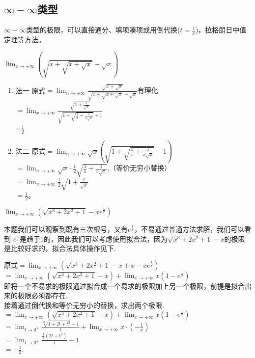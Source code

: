 \subsection{$\infty - \infty$类型}
$\infty - \infty$类型的极限，可以直接通分、填项凑项或用倒代换($t=\frac{1}{x}$)，拉格朗日中值定理等方法。
\begin{example}
	$\lim_{x \to +\infty}(\sqrt{x+\sqrt{x+\sqrt{x}}}-\sqrt{x})$
\end{example}
\begin{solution}
	\begin{enumerate}
		\item 法一
		      原式$=\lim_{n \to +\infty}\frac{\sqrt{x+\sqrt{x}}}{\sqrt{x+\sqrt{x+\sqrt{x}}}+\sqrt{x}}\text{有理化}$\\
		      $=\lim_{x \to +\infty}\frac{\sqrt{1+\frac{1}{\sqrt{x}}}}{\sqrt{1+\sqrt{\frac{1}{x}+\frac{1}{x\sqrt{x}}}}+1}$\\
		      =$\frac{1}{2}$
		\item 法二
		      原式$=\lim_{n \to +\infty}\sqrt{x}(\sqrt {1+\sqrt{\frac{1}{x}+\frac{1}{x\sqrt{x}}}}-1)$\\
		      $=\lim_{n \to +\infty}\sqrt{x}\cdot \frac{1}{2}\sqrt{\frac{1}{x}+\frac{1}{x\sqrt{x}}}.$（等价无穷小替换）\\
		      $=\lim_{n \to +\infty}\frac{1}{2}\sqrt{1+\frac{1}{\sqrt{x}}}$\\
		      $=\frac{1}{2}$。
	\end{enumerate}
\end{solution}
\begin{example}
	$\lim_{x \to +\infty}(\sqrt{x^3+2x^2+1}-xe^{\frac{1}{x}})$
	\begin{solution}
		本题我们可以观察到既有三次根号，又有$e^{\frac{1}{x}}$，不易通过普通方法求解，我们可以看到
		$e^{\frac{1}{x}}$是趋于1的，因此我们可以考虑使用拟合法，因为$\sqrt{x^3+2x^2+1}-x$的极限是比较好求的，拟合法具体操作见下.

		原式$=\lim_{x \to +\infty}(\sqrt{x^3+2x^2+1}-x+x-xe^{\frac{1}{x}})$\\
		$=\lim_{x \to +\infty}(\sqrt{x^3+2x^2+1}-x)+\lim_{x \to +\infty}x(1-e^{\frac{1}{x}})$\\
		即将一个不易求的极限通过拟合成一个易求的极限加上另一个极限，前提是拟合出来的极限必须都存在.\\
		接着通过倒代换和等价无穷小的替换，求出两个极限.\\
		$=\lim_{x \to +\infty}(\sqrt{x^3+2x^2+1}-x)+\lim_{x \to +\infty}x(1-e^{\frac{1}{x}})$\\
		$=\lim_{t \to 0^+}\frac{\sqrt[3]{1+2t+t^3}-1}{t}+\lim_{x \to +\infty}x\cdot (-\frac{1}{x})$\\
		$=\lim_{t \to 0^+}\frac{\frac{1}{3}(2t+t^3)}{t}-1$\\
		$=-\frac{1}{3}$.
	\end{solution}
\end{example}


